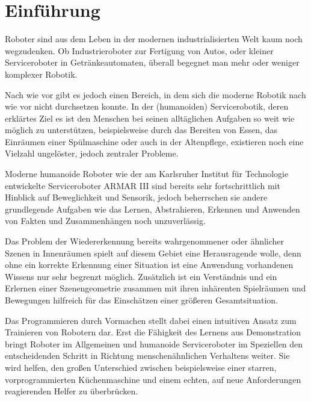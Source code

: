 \chapter{Einführung}\label{ch:einleitung}

Roboter sind aus dem Leben in der modernen industrialisierten Welt kaum noch wegzudenken.
Ob Industrieroboter zur Fertigung von Autos, oder kleiner Serviceroboter in Getränkeautomaten, überall begegnet man mehr oder weniger komplexer Robotik.

Nach wie vor gibt es jedoch einen Bereich, in dem sich die moderne Robotik nach wie vor nicht durchsetzen konnte.
In der (humanoiden) Servicerobotik, deren erklärtes Ziel es ist den Menschen bei seinen alltäglichen Aufgaben so weit wie möglich zu unterstützen, beispielsweise durch das Bereiten von Essen, das Einräumen einer Spülmaschine oder auch in der Altenpflege, existieren noch eine Vielzahl ungelöster, jedoch zentraler Probleme.

Moderne humanoide Roboter wie der am Karlsruher Institut für Technologie entwickelte Serviceroboter ARMAR III sind bereits sehr fortschrittlich mit Hinblick auf Beweglichkeit und Sensorik, jedoch beherrschen sie andere grundlegende Aufgaben wie das Lernen, Abstrahieren, Erkennen und Anwenden von Fakten und Zusammenhängen noch unzuverlässig.

Das Problem der Wiedererkennung bereits wahrgenommener oder ähnlicher Szenen in Innenräumen spielt auf diesem Gebiet eine Herausragende wolle, denn ohne ein korrekte Erkennung einer Situation ist eine Anwendung vorhandenen Wissens nur sehr begrenzt möglich.
Zusätzlich ist ein Verständnis und ein Erlernen einer Szenengeometrie zusammen mit ihren inhärenten Spielräumen und Bewegungen hilfreich für das Einschätzen einer größeren Gesamtsituation.

Das Programmieren durch Vormachen stellt dabei einen intuitiven Ansatz zum Trainieren von Robotern dar.
Erst die Fähigkeit des Lernens aus Demonstration bringt Roboter im Allgemeinen und humanoide Serviceroboter im Speziellen den entscheidenden Schritt in Richtung menschenähnlichen Verhaltens weiter.
Sie wird helfen, den großen Unterschied zwischen beispielsweise einer starren, vorprogrammierten Küchenmaschine und einem echten, auf neue Anforderungen reagierenden Helfer zu überbrücken.

